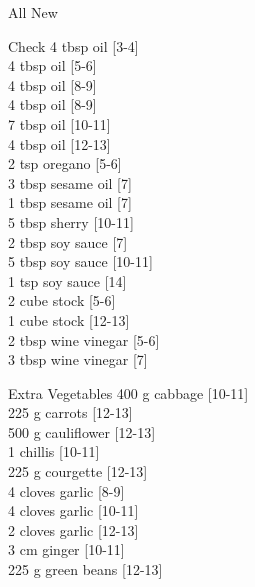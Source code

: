 \begin{menu}{All New}
\begin{shoppinglist}{Check}
      4 tbsp oil 
        {\scriptsize[3-4]}\\
      4 tbsp oil 
        {\scriptsize[5-6]}\\
      4 tbsp oil 
        {\scriptsize[8-9]}\\
      4 tbsp oil 
        {\scriptsize[8-9]}\\
      7 tbsp oil 
        {\scriptsize[10-11]}\\
      4 tbsp oil 
        {\scriptsize[12-13]}\\
      2 tsp oregano 
        {\scriptsize[5-6]}\\
      3 tbsp sesame oil 
        {\scriptsize[7]}\\
      1 tbsp sesame oil 
        {\scriptsize[7]}\\
      5 tbsp sherry 
        {\scriptsize[10-11]}\\
      2 tbsp soy sauce 
        {\scriptsize[7]}\\
      5 tbsp soy sauce 
        {\scriptsize[10-11]}\\
      1 tsp soy sauce 
        {\scriptsize[14]}\\
      2 cube stock 
        {\scriptsize[5-6]}\\
      1 cube stock 
        {\scriptsize[12-13]}\\
      2 tbsp wine vinegar 
        {\scriptsize[5-6]}\\
      3 tbsp wine vinegar 
        {\scriptsize[7]}\\
      \end{shoppinglist}%
      \begin{shoppinglist}{Extra Vegetables}
      400 g cabbage 
        {\scriptsize[10-11]}\\
      225 g carrots 
        {\scriptsize[12-13]}\\
      500 g cauliflower 
        {\scriptsize[12-13]}\\
      1  chillis 
        {\scriptsize[10-11]}\\
      225 g courgette 
        {\scriptsize[12-13]}\\
      4 cloves garlic 
        {\scriptsize[8-9]}\\
      4 cloves garlic 
        {\scriptsize[10-11]}\\
      2 cloves garlic 
        {\scriptsize[12-13]}\\
      3 cm ginger 
        {\scriptsize[10-11]}\\
      225 g green beans 
        {\scriptsize[12-13]}\\

\end{shoppinglist}
\end{menu}
